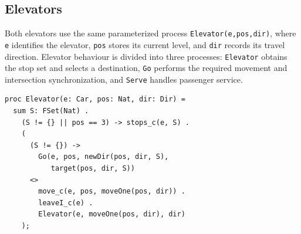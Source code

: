 \subsection{Elevators}
\label{subsec:elevators}

Both elevators use the same parameterized process \texttt{Elevator(e,pos,dir)}, where \texttt{e} identifies the elevator, \texttt{pos} stores its current level, and \texttt{dir} records its travel direction. Elevator behaviour is divided into three processes: \texttt{Elevator} obtains the stop set and selects a destination, \texttt{Go} performs the required movement and intersection synchronization, and \texttt{Serve} handles passenger service.

\begin{lstlisting}
proc Elevator(e: Car, pos: Nat, dir: Dir) =
  sum S: FSet(Nat) .
    (S != {} || pos == 3) -> stops_c(e, S) .
    (
      (S != {}) ->
        Go(e, pos, newDir(pos, dir, S),
           target(pos, dir, S))
      <>
        move_c(e, pos, moveOne(pos, dir)) .
        leaveI_c(e) .
        Elevator(e, moveOne(pos, dir), dir)
    );
\end{lstlisting}

